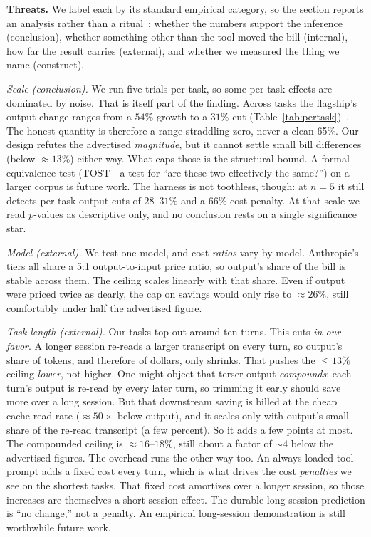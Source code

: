 \textbf{Threats.} We label each by its standard empirical category, so the section reports an analysis
rather than a ritual~\cite{lago2024threats}: whether the numbers support the inference (conclusion),
whether something other than the tool moved the bill (internal), how far the result carries
(external), and whether we measured the thing we name (construct).

\emph{Scale (conclusion).} We run five trials per task, so some per-task effects are dominated by
noise. That is itself part of the finding. Across tasks the flagship's output change ranges from a
$54\%$ growth to a $31\%$ cut (Table~\ref{tab:pertask})~\cite{agarwal2021precipice}. The honest
quantity is therefore a range straddling zero, never a clean 65\%. Our design refutes the advertised
\emph{magnitude}, but it cannot settle small bill differences (below ${\approx}13\%$) either way. What
caps those is the structural bound. A formal equivalence test (TOST---a test
for ``are these two effectively the same?'') on a larger corpus is future work. The harness is not
toothless, though: at $n{=}5$ it still detects per-task output cuts of
$28$--$31\%$ and a $66\%$ cost penalty. At that scale we read $p$-values as descriptive only,
and no conclusion rests on a single significance star.

\emph{Model (external).} We test one model, and cost \emph{ratios} vary by model. Anthropic's tiers all share a
5:1 output-to-input price ratio, so output's share of the bill is stable across them. The ceiling
scales linearly with that share. Even if output were priced twice as dearly, the cap on savings would
only rise to ${\approx}26\%$, still comfortably under half the advertised figure.

\emph{Task length (external).} Our tasks top out around ten turns. This cuts \emph{in our favor}. A longer session
re-reads a larger transcript on every turn, so output's share of tokens, and therefore of dollars, only
shrinks. That pushes the ${\le}13\%$ ceiling \emph{lower}, not higher. One might object that terser
output \emph{compounds}: each turn's output is re-read by every later turn, so trimming it early should
save more over a long session. But that downstream saving is billed at the cheap cache-read rate
(${\approx}50\times$ below output), and it scales only with output's small share of the re-read
transcript (a few percent). So it adds a few points at most. The compounded
ceiling is ${\approx}16$--$18\%$, still about a factor of ${\sim}4$ below the advertised figures. The
overhead runs the other way too. An always-loaded tool prompt adds a fixed cost every turn, which is
what drives the cost \emph{penalties} we see on the shortest tasks. That fixed cost amortizes over a
longer session, so those increases are themselves a short-session effect. The durable long-session
prediction is ``no change,'' not a penalty. An empirical long-session demonstration is still worthwhile
future work.

